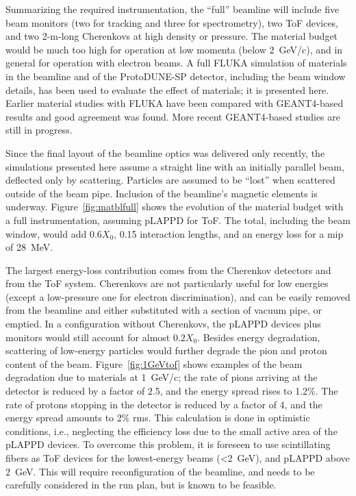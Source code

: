 Summarizing %
the required instrumentation, the ``full'' beamline will  include
 five beam monitors (two for tracking and three for spectrometry), two ToF devices, and two 2-m-long Cherenkovs at high density or pressure. The material budget would be much too high for operation at low momenta (below 2~GeV/c),  and in general for operation with electron beams.  
A full FLUKA\cite{fluka05,Fluka15}  simulation of materials in the beamline and of the ProtoDUNE-SP detector, including the beam window details, has been used to evaluate the effect of materials; it is presented here. 
Earlier material studies with FLUKA have been compared with GEANT4-based results and good agreement was found. More recent GEANT4-based studies are still in progress.

Since the final layout of the beamline optics was delivered only recently, the simulations presented here assume a straight line with an initially parallel beam, deflected only by scattering. Particles are assumed to be ``lost'' when scattered outside of the beam pipe. Inclusion of the beamline's magnetic elements is underway. 
 Figure~\ref{fig:matblfull} shows the evolution of the material budget with a full instrumentation, assuming pLAPPD for ToF. The total, including the beam window, would add $0.6X_0$, 0.15 interaction lengths, and an energy loss for a mip of 28~MeV.

The largest energy-loss contribution comes from the Cherenkov detectors and from the  ToF system. Cherenkovs are not particularly useful for low energies (except a low-pressure one for electron discrimination), and can be easily removed from the beamline and either substituted with a section of vacuum pipe, or emptied.  
In a configuration %
without Cherenkovs, the pLAPPD devices plus monitors would still account for almost  $0.2X_0$. Besides energy degradation, scattering of low-energy particles would  further degrade the pion and proton content of the beam.  Figure~\ref{fig:1GeVtof} shows examples of the beam degradation due to materials at 1~GeV/c; the rate of pions arriving at the detector is reduced by a factor of 2.5, and the energy spread rises to 1.2\%. The rate of protons stopping in the detector is reduced by a factor of 4, and the energy spread amounts to 2\% rms. This calculation is done in optimistic conditions, i.e., neglecting the efficiency loss due to the small active area of the pLAPPD devices.
%
To overcome this problem, it is foreseen to use scintillating fibers as ToF devices for the lowest-energy beams (<2~GeV), and pLAPPD above 2~GeV.
   This will require reconfiguration of the beamline, and needs to be carefully considered in the run plan, but is known to be feasible. %

